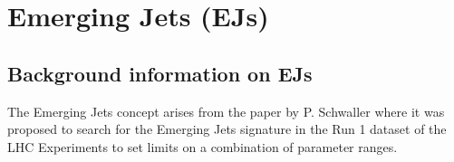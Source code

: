 \chapter{Emerging Jets (EJs) \label{ch:emj}}


\section{Background information on EJs}

The Emerging Jets concept arises from the paper by P. Schwaller \cite{Schwaller:2015gea} where it was proposed to search for the Emerging Jets signature in the Run 1 dataset of the LHC Experiments to set limits on a combination of parameter ranges.


